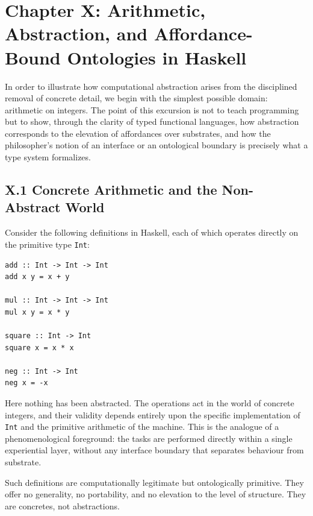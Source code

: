 \documentclass[11pt,letterpaper]{article}
\begin{document}
\section{Chapter X: Arithmetic, Abstraction, and Affordance-Bound Ontologies in Haskell}

In order to illustrate how computational abstraction arises from the disciplined removal of concrete detail, we begin with the simplest possible domain: arithmetic on integers. The point of this excursion is not to teach programming but to show, through the clarity of typed functional languages, how abstraction corresponds to the elevation of affordances over substrates, and how the philosopher’s notion of an interface or an ontological boundary is precisely what a type system formalizes.

\subsection{X.1 Concrete Arithmetic and the Non-Abstract World}

Consider the following definitions in Haskell, each of which operates directly on the primitive type \texttt{Int}:

\begin{verbatim}
add :: Int -> Int -> Int
add x y = x + y

mul :: Int -> Int -> Int
mul x y = x * y

square :: Int -> Int
square x = x * x

neg :: Int -> Int
neg x = -x
\end{verbatim}

Here nothing has been abstracted. The operations act in the world of concrete integers, and their validity depends entirely upon the specific implementation of \texttt{Int} and the primitive arithmetic of the machine. This is the analogue of a phenomenological foreground: the tasks are performed directly within a single experiential layer, without any interface boundary that separates behaviour from substrate.

Such definitions are computationally legitimate but ontologically primitive. They offer no generality, no portability, and no elevation to the level of structure. They are concretes, not abstractions.
\end{document}

